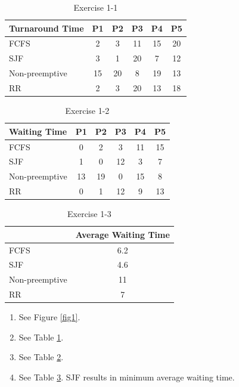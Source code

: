 \begin{exercise}[]
\begin{solution}
    \begin{table}
        \centering
        \begin{tabular}{lccccc}
        \hline
        Turnaround Time & P1 & P2 & P3 & P4 & P5 \\ \hline
        FCFS            & 2  & 3  & 11 & 15 & 20 \\
        SJF             & 3  & 1  & 20 & 7  & 12 \\
        Non-preemptive  & 15 & 20 & 8  & 19 & 13 \\
        RR              & 2  & 3  & 20 & 13 & 18 \\ \hline
        \end{tabular}
        \caption{Exercise 1-1 \label{tab1-1}}
    \end{table}

    \begin{table}
        \centering
        \begin{tabular}{lccccc}
        \hline
        Waiting Time   & P1 & P2 & P3 & P4 & P5 \\ \hline
        FCFS           & 0  & 2  & 3  & 11 & 15 \\
        SJF            & 1  & 0  & 12 & 3  & 7  \\
        Non-preemptive & 13 & 19 & 0  & 15 & 8  \\
        RR             & 0  & 1  & 12 & 9  & 13 \\ \hline
        \end{tabular}
        \caption{Exercise 1-2 \label{tab1-2}}
    \end{table}

    \begin{table}
        \centering
        \begin{tabular}{lc}
        \hline
                       & Average Waiting Time \\ \hline
        FCFS           & 6.2                  \\
        SJF            & 4.6                  \\
        Non-preemptive & 11                   \\
        RR             & 7                    \\ \hline
        \end{tabular}
        \caption{Exercise 1-3 \label{tab1-3}}
    \end{table}
  \begin{enumerate}
      \item { See Figure \ref{fig1}. }
      \item { See Table \ref{tab1-1}. }
      \item{See Table \ref{tab1-2}. }
      \item{  See Table \ref{tab1-3}.        SJF results in minimum average waiting time.
      }
  \end{enumerate}
  \end{solution}
  \label{ex1}
\end{exercise}


